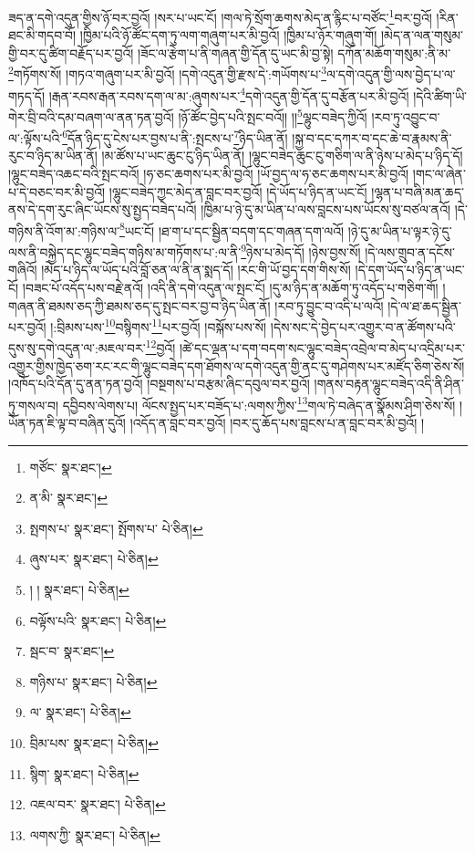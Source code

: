 ཟད་ན་དགེ་འདུན་གྱིས་ཉོ་བར་བྱའོ། །སར་པ་ཡང་ངོ། །གལ་ཏེ་སྲོག་ཆགས་མེད་ན་རྙིང་པ་བཙོང་\footnote{གཙོང་  སྣར་ཐང་། }བར་བྱའོ། །རིན་ཐང་མི་གདབ་བོ། །ཁྱིམ་པའི་ཉོ་ཚོང་དག་ཏུ་ལག་གཞུག་པར་མི་བྱའོ། །ཁྱིམ་པ་ཉོར་གཞུག་གོ། །མེད་ན་ལན་གསུམ་གྱི་བར་དུ་ཚིག་བརྗོད་པར་བྱའོ། །ཟོང་ལ་རྩེག་པ་ནི་གཞན་གྱི་དོན་དུ་ཡང་མི་བྱ་སྟེ། དཀོན་མཆོག་གསུམ་:ནི་མ་\footnote{ན་མི་  སྣར་ཐང་། }གཏོགས་སོ། །གཏའ་གཞུག་པར་མི་བྱའོ། །དགེ་འདུན་གྱི་རྫས་དེ་:གཡོགས་པ་\footnote{སྤགས་པ་  སྣར་ཐང་། སྤོགས་པ་  པེ་ཅིན། }ལ་དགེ་འདུན་གྱི་ལས་བྱེད་པ་ལ་གཏད་དོ། །རྒན་རབས་རྒན་རབས་དག་ལ་མ་:ཞུགས་པར་\footnote{ཞུས་པར་  སྣར་ཐང་།  པེ་ཅིན། }དགེ་འདུན་གྱི་དོན་དུ་བརྩོན་པར་མི་བྱའོ། །དེའི་ཚིག་ཡི་གེར་བྲི་བའི་དམ་བཞག་ལ་ནན་ཏན་བྱའོ། །ཉོ་ཚོང་བྱེད་པའི་སྤང་བའོ།། །།\footnote{། །  སྣར་ཐང་།  པེ་ཅིན། }ལྷུང་བཟེད་ཀྱིའོ། །རབ་ཏུ་འབྱུང་བ་ལ་:ལྟོས་པའི་\footnote{བལྟོས་པའི་  སྣར་ཐང་།  པེ་ཅིན། }དོན་ཉིད་དུ་ངེས་པར་བྱས་པ་ནི་:སྤངས་པ་\footnote{སྦང་བ་  སྣར་ཐང་། }ཉིད་ཡིན་ནོ། །སྐྱ་བ་དང་དཀར་བ་དང་ཆེ་བ་རྣམས་ནི་རུང་བ་ཉིད་མ་ཡིན་ནོ། །མ་ཚོས་པ་ཡང་ཆུང་ངུ་ཉིད་ཡིན་ནོ། །ལྷུང་བཟེད་ཆུང་ངུ་གཅིག་ལ་ནི་ཉེས་པ་མེད་པ་ཉིད་དོ། །ལྷུང་བཟེད་འཆང་བའི་སྤང་བའོ། །ཧ་ཅང་ཆགས་པར་མི་བྱའོ། །ཡོ་བྱད་ལ་ཧ་ཅང་ཆགས་པར་མི་བྱའོ། །གང་ལ་ཞེན་པ་དེ་བཅང་བར་མི་བྱའོ། །ལྷུང་བཟེད་ཀྱང་མེད་ན་བླང་བར་བྱའོ། །དེ་ཡོད་པ་ཉིད་ན་ཡང་ངོ། །ལྷན་པ་བཞི་མན་ཆད་ནས་དེ་དག་རུང་ཞིང་ཡོངས་སུ་སྤྱད་བཟེད་པའོ། །ཁྱིམ་པ་ཉེ་དུ་མ་ཡིན་པ་ལས་བླངས་པས་ཡོངས་སུ་བཙལ་ནའོ། །དེ་གཉིས་ནི་འོག་མ་:གཉིས་ལ་\footnote{གཉིས་པ་  སྣར་ཐང་།  པེ་ཅིན། }ཡང་ངོ། །ཐ་ག་པ་དང་སྦྱིན་བདག་དང་གཞན་དག་ལའོ། །ཉེ་དུ་མ་ཡིན་པ་ལྟར་ཉེ་དུ་ལས་ནི་བསྐྱེད་དང་ལྷུང་བཟེད་གཉིས་མ་གཏོགས་པ་:ལ་ནི་\footnote{ལ་  སྣར་ཐང་།  པེ་ཅིན། }ཉེས་པ་མེད་དོ། །ཉེས་བྱས་སོ། །དེ་ལས་གྲུབ་ན་དངོས་གཞིའོ། །མེད་པ་ཉིད་ལ་ཡོད་པའི་བློ་ཅན་ལ་ནི་ན་སྨད་དོ། །རང་གི་ཡོ་བྱད་དག་གིས་སོ། །དེ་དག་ཡོད་པ་ཉིད་ན་ཡང་ངོ། །བཟང་པོ་འདོད་པས་བརྗེ་ནའོ། །འདི་ནི་དགེ་འདུན་ལ་སྤང་ངོ། །དུ་མ་ཉིད་ན་མཆོག་ཏུ་འདོད་པ་གཅིག་གོ། །གཞན་ནི་ཐམས་ཅད་ཀྱི་ཐམས་ཅད་དུ་སྤང་བར་བྱ་བ་ཉིད་ཡིན་ནོ། །རབ་ཏུ་བྱུང་བ་འདི་པ་ལའོ། །དེ་ལ་ཐ་ཆད་སྦྱིན་པར་བྱའོ། །:བྲིམས་པས་\footnote{བྲིམ་པས་  སྣར་ཐང་།  པེ་ཅིན། }བསྙིགས་\footnote{སྙིག་  སྣར་ཐང་།  པེ་ཅིན། }པར་བྱའོ། །བསྐོས་པས་སོ། །དེས་སང་དེ་བྱེད་པར་འགྱུར་བ་ན་ཚོགས་པའི་དུས་སུ་དགེ་འདུན་ལ་:མཇལ་བར་\footnote{འཇལ་བར་  སྣར་ཐང་།  པེ་ཅིན། }བྱའོ། །ཚེ་དང་ལྡན་པ་དག་བདག་སང་ལྷུང་བཟེད་འབྲེལ་བ་མེད་པ་འདྲིམ་པར་འགྱུར་གྱིས་ཁྱེད་ཅག་རང་རང་གི་ལྷུང་བཟེད་དག་ཐོགས་ལ་དགེ་འདུན་གྱི་ནང་དུ་གཤེགས་པར་མཛོད་ཅིག་ཅེས་སོ། །འཁོད་པའི་དོན་དུ་ནན་ཏན་བྱའོ། །བསྔགས་པ་བརྩམ་ཞིང་དབུལ་བར་བྱའོ། །གནས་བརྟན་ལྷུང་བཟེད་འདི་ནི་ཤིན་ཏུ་གསལ་བ། དབྱིབས་ལེགས་པ། ལོངས་སྤྱད་པར་བཟོད་པ་:ལགས་ཀྱིས་\footnote{ལགས་ཀྱི་  སྣར་ཐང་།  པེ་ཅིན། }གལ་ཏེ་བཞེད་ན་སྣོམས་ཤིག་ཅེས་སོ། །ཡོན་ཏན་ཇི་ལྟ་བ་བཞིན་དུའོ། །འདོད་ན་བླང་བར་བྱའོ། །བར་དུ་ཆོད་པས་བླངས་པ་ན་བླང་བར་མི་བྱའོ། །

